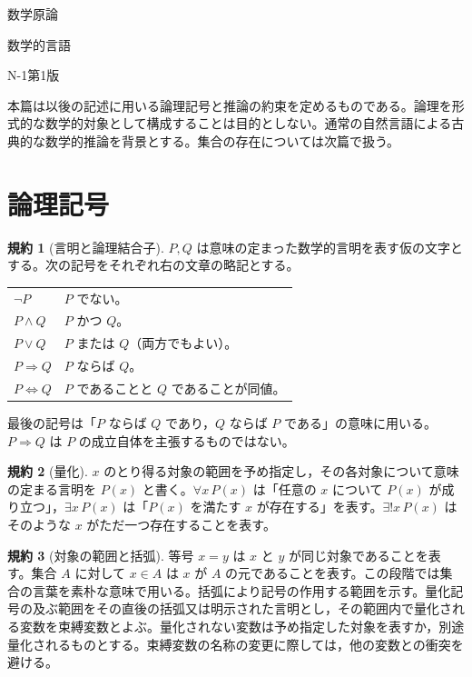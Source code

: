 \documentclass[a5paper,10pt,dvipdfmx]{jsarticle}
\theoremstyle{definition}
\newtheorem{ruledef}{規約}[section]
\theoremstyle{plain}
\begin{document}
\begin{center}
{\small 数学原論}\par\vspace{4mm}
{\LARGE 数学的言語}\par\vspace{2mm}
{\small N-1\quad 第1版}
\end{center}
\noindent 本篇は以後の記述に用いる論理記号と推論の約束を定めるものである。論理を形式的な数学的対象として構成することは目的としない。通常の自然言語による古典的な数学的推論を背景とする。集合の存在については次篇で扱う。
\section{論理記号}
\begin{ruledef}[言明と論理結合子]
$P,Q$ は意味の定まった数学的言明を表す仮の文字とする。次の記号をそれぞれ右の文章の略記とする。
\begin{center}
\begin{tabular}{ll}
$\neg P$ & $P$ でない。\\
$P\land Q$ & $P$ かつ $Q$。\\
$P\lor Q$ & $P$ または $Q$（両方でもよい）。\\
$P\Rightarrow Q$ & $P$ ならば $Q$。\\
$P\Leftrightarrow Q$ & $P$ であることと $Q$ であることが同値。
\end{tabular}
\end{center}
最後の記号は「$P$ ならば $Q$ であり，$Q$ ならば $P$ である」の意味に用いる。$P\Rightarrow Q$ は $P$ の成立自体を主張するものではない。
\end{ruledef}
\begin{ruledef}[量化]
$x$ のとり得る対象の範囲を予め指定し，その各対象について意味の定まる言明を $P(x)$ と書く。$\forall x\,P(x)$ は「任意の $x$ について $P(x)$ が成り立つ」，$\exists x\,P(x)$ は「$P(x)$ を満たす $x$ が存在する」を表す。$\exists!x\,P(x)$ はそのような $x$ がただ一つ存在することを表す。
\end{ruledef}
\begin{ruledef}[対象の範囲と括弧]
等号 $x=y$ は $x$ と $y$ が同じ対象であることを表す。集合 $A$ に対して $x\in A$ は $x$ が $A$ の元であることを表す。この段階では集合の言葉を素朴な意味で用いる。括弧により記号の作用する範囲を示す。量化記号の及ぶ範囲をその直後の括弧又は明示された言明とし，その範囲内で量化される変数を束縛変数とよぶ。量化されない変数は予め指定した対象を表すか，別途量化されるものとする。束縛変数の名称の変更に際しては，他の変数との衝突を避ける。
\end{ruledef}
\end{document}
